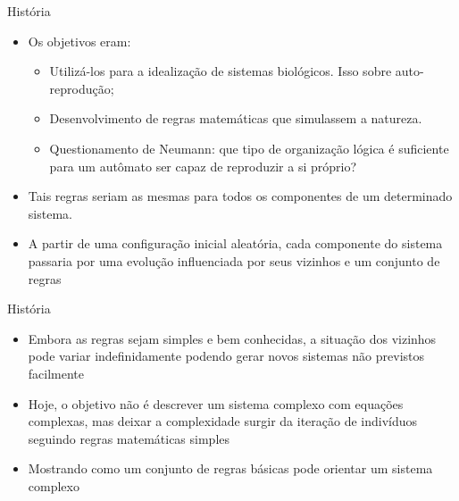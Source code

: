 \documentclass[compress, hide notes]{beamer}
\begin{document}
\begin{frame}{História \cite{uepg}}
	\begin{itemize}
 		\setlength\itemsep{12pt}
		\item Os objetivos eram:
        \begin{itemize}
        \setlength\itemsep{6pt}
        	\item Utilizá-los para a idealização de sistemas biológicos. Isso sobre auto-reprodução;
			\item Desenvolvimento de regras matemáticas que simulassem a natureza.
            \item Questionamento de Neumann: que tipo de organização lógica é suficiente para um autômato ser capaz de reproduzir a si próprio?
        \end{itemize}
			
		\item Tais regras seriam as mesmas para todos os componentes de um determinado sistema.
		
		\item A partir de uma configuração inicial aleatória, cada componente do sistema passaria por uma evolução influenciada por seus vizinhos e um conjunto de regras
		
	\end{itemize}
\end{frame}

\begin{frame}{História}
	\begin{itemize} 
    	\item Embora as regras sejam simples e bem conhecidas, a situação dos vizinhos pode variar indefinidamente podendo gerar novos sistemas não previstos facilmente \cite{uepg}
	
		\bigskip
    
		\item Hoje, o objetivo não é descrever um sistema complexo com equações complexas, mas deixar a complexidade surgir da iteração de indivíduos seguindo regras matemáticas simples \cite{ufmg}
        
        \bigskip
        
        \item Mostrando como um conjunto de regras básicas pode orientar um sistema complexo \cite{ufrj}
		
	\end{itemize}
\end{frame}
\end{document}

